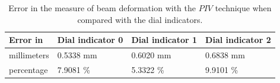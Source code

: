 \begin{table}[h]
  \begin{tabular}{ p{} | p{} | p{} | p{}}
    \hline
    Error in      & Dial indicator 0 & Dial indicator 1 & Dial indicator 2 \\ \hline \hline
    millimeters & 0.5338 mm & 0.6020 mm & 0.6838 mm \\ \hline
    percentage  & 7.9081 \% & 5.3322 \% & 9.9101 \% \\ \hline
    
  \end{tabular}
  \caption{Error in the measure of beam deformation with the $PIV$ technique when compared with the dial indicators.}
  \label{tab:watch2}
\end{table}

